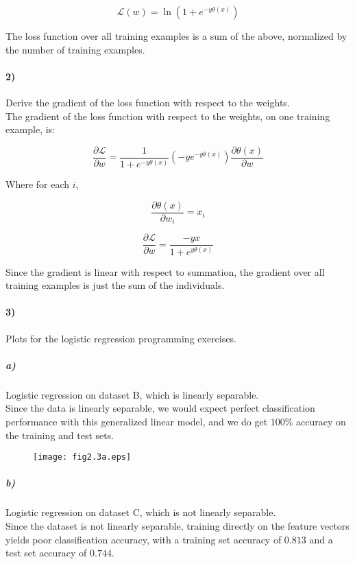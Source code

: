 \documentclass[10pt,letter]{article}
\begin{document}
\[ \mathcal{L}(w) = \ln(1 + e^{-y\theta(x)}) \]

The loss function over all training examples is a sum of the above, normalized by the number of 
training examples.

\paragraph{2)} Derive the gradient of the loss function with respect to the weights.\\

The gradient of the loss function with respect to the weights, on one training example, is:

\[ \frac{\partial \mathcal{L}}{\partial w} = \frac{1}{1 + e^{-y\theta(x)}}(-ye^{-y\theta(x)})
    \frac{\partial\theta(x)}{\partial w} \]

Where for each $i$,

\[ \frac{\partial\theta(x)}{\partial w_i} = x_i \]

\[ \frac{\partial \mathcal{L}}{\partial w} = \frac{-yx}{1 + e^{y\theta(x)}} \]

Since the gradient is linear with respect to summation, the gradient over all training examples is just the sum of the individuals.

\paragraph{3)} Plots for the logistic regression programming exercises.

\subparagraph{a)} Logistic regression on dataset B, which is linearly separable.\\

Since the data is linearly separable, we would expect perfect classification performance with 
this generalized linear model, and we do get $100\%$ accuracy on the training and test sets.

\begin{figure}[b]
\vspace*{-2cm}
\centering
\texttt{[image: fig2.3a.eps]}
\end{figure}

\subparagraph{b)} Logistic regression on dataset C, which is not linearly separable.\\

Since the dataset is not linearly separable, training directly on the feature vectors yields poor 
classification accuracy, with a training set accuracy of $0.813$ and a test set accuracy of $0.744$.
\end{document}
